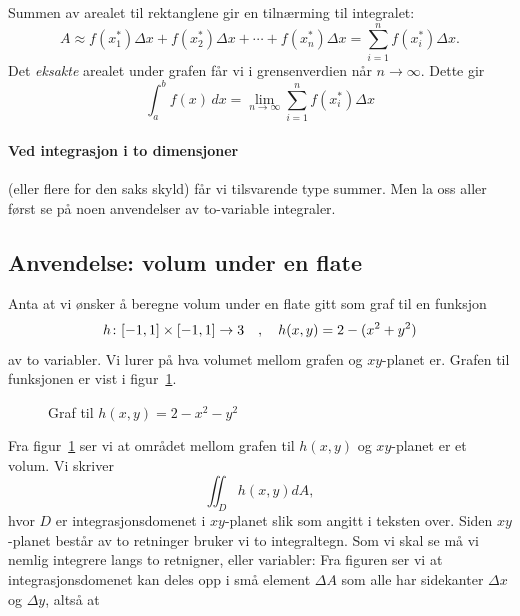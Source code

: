 Summen av arealet til rektanglene gir en tilnærming til integralet:
\[
A \approx f(x_1^*) \Delta x + f(x_2^*) \Delta x + \cdots + f(x_n^*) \Delta x = \sum_{i=1}^n f(x_i^*)\Delta x.
\]
Det \textit{eksakte} arealet under grafen får vi i grensenverdien når \( n \to \infty \). Dette gir 
\[
\int_a^b f(x) \, dx = \lim_{n \to \infty} \sum_{i=1}^n f(x_i^*) \Delta x
\]

\paragraph{Ved integrasjon i to dimensjoner} (eller flere for den saks skyld) får vi tilsvarende type summer. Men la oss aller først se på noen anvendelser av to-variable integraler.

\subsection*{Anvendelse: volum under en flate} 
Anta at vi ønsker å beregne volum under en flate gitt som graf til en funksjon
\[h \colon [-1,1] \times [-1,1] \rightarrow 3\quad,\quad h(x,y)=2-(x^2+y^2)\]
av to variabler. Vi lurer på hva volumet mellom grafen og $xy$-planet er. Grafen til funksjonen er vist i figur~\ref{fig:1}.
\begin{figure}[ht]
\begin{center}
\end{center}
  \caption{Graf til $h(x,y)=2-x^2-y^2$}
    \label{fig:1}
\end{figure}

Fra figur~\ref{fig:1} ser vi at området mellom grafen til $h(x,y)$ og $xy$-planet er et volum. Vi skriver
\[\iint_D h(x,y) dA,\]
hvor $D$ er integrasjonsdomenet i $xy$-planet slik som angitt i teksten over. Siden $xy$-planet består av to retninger bruker vi to integraltegn. Som vi skal se må vi nemlig integrere langs to retnigner, eller variabler: Fra figuren ser vi at integrasjonsdomenet kan deles opp i små element $\Delta A$ som alle har sidekanter \(\Delta x\) og \(\Delta y\), altså at

